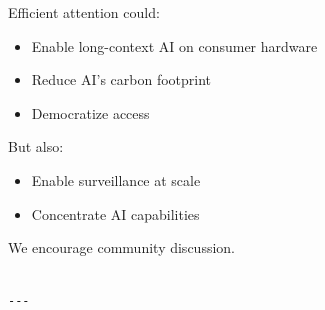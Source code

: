 Efficient attention could:

\begin{itemize}
\item Enable long-context AI on consumer hardware
\item Reduce AI's carbon footprint
\item Democratize access

\end{itemize}
But also:

\begin{itemize}
\item Enable surveillance at scale
\item Concentrate AI capabilities

\end{itemize}
We encourage community discussion.
\begin{lstlisting}

---
\end{lstlisting}